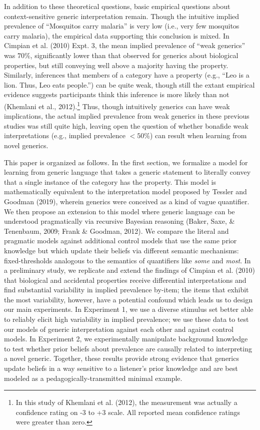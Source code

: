 \documentclass[floatsintext,doc]{apa6}
\let\rmarkdownfootnote\footnote%
\def\footnote{\protect\rmarkdownfootnote}
\begin{document}
In addition to these theoretical questions, basic empirical questions about context-sensitive generic interpretation remain.
Though the intuitive implied prevalence of \enquote{Mosquitos carry malaria} is very low (i.e., very few mosquitos carry malaria), the empirical data supporting this conclusion is mixed.
In Cimpian et al. (2010) Expt. 3, the mean implied prevalence of \enquote{weak generics} was \(70\%\), significantly lower than that observed for generics about biological properties, but still conveying well above a majority having the property.
Similarly, inferences that members of a category have a property (e.g., \enquote{Leo is a lion. Thus, Leo eats people.}) can be quite weak, though still the extant empirical evidence suggests participants think this inference is more likely than not (Khemlani et al., 2012).\footnote{In this study of Khemlani et al. (2012), the measurement was actually a confidence rating on -3 to +3 scale. All reported mean confidence ratings were greater than zero. }
Thus, though intuitively generics can have weak implications, the actual implied prevalence from weak generics in these previous studies was still quite high, leaving open the question of whether bonafide weak interpretations (e.g., implied prevalence \(<50\%\)) can result when learning from novel generics.

This paper is organized as follows.
In the first section, we formalize a model for learning from generic language that takes a generic statement to literally convey that a single instance of the category has the property.
This model is mathematically equivalent to the interpretation model proposed by Tessler and Goodman (2019), wherein generics were conceived as a kind of vague quantifier.
We then propose an extension to this model where generic language can be understood pragmatically via recursive Bayesian reasoning (Baker, Saxe, \& Tenenbaum, 2009; Frank \& Goodman, 2012).
We compare the literal and pragmatic models against additional control models that use the same prior knowledge but which update their beliefs via different semantic mechanisms: fixed-thresholds analogous to the semantics of quantifiers like \emph{some} and \emph{most}.
In a preliminary study, we replicate and extend the findings of Cimpian et al. (2010) that biological and accidental properties receive differential interpretations and find substantial variability in implied prevalence by-item; the items that exhibit the most variability, however, have a potential confound which leads us to design our main experiments.
In Experiment 1, we use a diverse stimulus set better able to reliably elicit high variability in implied prevalence; we use these data to test our models of generic interpretation against each other and against control models.
In Experiment 2, we experimentally manipulate background knowledge to test whether prior beliefs about prevalence are causally related to interpreting a novel generic.
Together, these results provide strong evidence that generics update beliefs in a way sensitive to a listener's prior knowledge and are best modeled as a pedagogically-transmitted minimal example.
\end{document}
